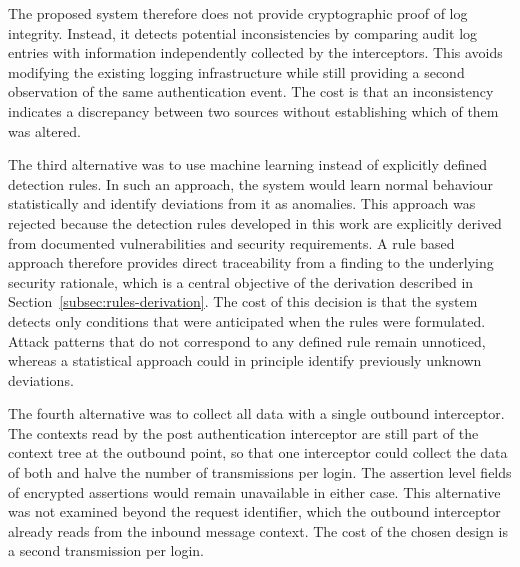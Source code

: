 \documentclass[../main.tex]{subfiles}
\begin{document}
The proposed system therefore does not provide cryptographic proof of log integrity. 
Instead, it detects potential inconsistencies by comparing audit log entries with information 
independently collected by the interceptors. 
This avoids modifying the existing logging infrastructure while still providing a second 
observation of the same authentication event. 
The cost is that an inconsistency indicates a discrepancy between two sources without establishing 
which of them was altered.

The third alternative was to use machine learning instead of explicitly defined detection rules. 
In such an approach, the system would learn normal behaviour statistically and identify deviations 
from it as anomalies.
This approach was rejected because the detection rules developed in this work are explicitly 
derived from documented vulnerabilities and security requirements. 
A rule based approach therefore provides direct traceability from a finding to the underlying 
security rationale, which is a central objective of the derivation described in 
Section~\ref{subsec:rules-derivation}. 
The cost of this decision is that the system detects only conditions that were anticipated when 
the rules were formulated. 
Attack patterns that do not correspond to any defined rule remain unnoticed, whereas a statistical 
approach could in principle identify previously unknown deviations. 

The fourth alternative was to collect all data with a single outbound interceptor. 
The contexts read by the post authentication interceptor are still part of the context tree at the 
outbound point, so that one interceptor could collect the data of both and halve the number of 
transmissions per login. 
The assertion level fields of encrypted assertions would remain unavailable in either case. 
This alternative was not examined beyond the request identifier, which the outbound interceptor 
already reads from the inbound message context. 
The cost of the chosen design is a second transmission per login.
\end{document}
